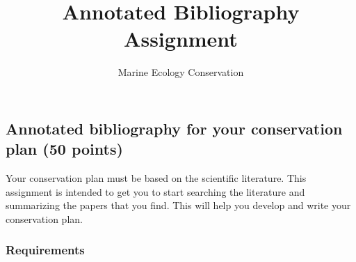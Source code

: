 \documentclass[12pt]{article}
\title{Annotated Bibliography Assignment}
\author{Marine Ecology \amper Conservation}
\date{}                                           %
\begin{document}
\thispagestyle{plain}


\subsection*{Annotated bibliography for your conservation plan (50 points)}

Your conservation plan must be based on the scientific literature. This assignment is intended to get you to start searching the literature and summarizing the papers that you find. This will help you develop and write your conservation plan. 

\subsubsection*{Requirements}
\end{document}
